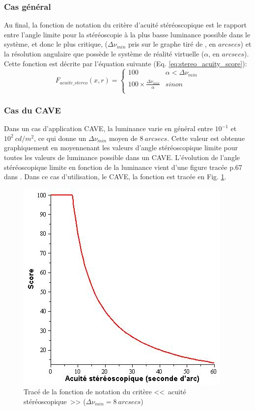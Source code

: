 	\subsubsection{Cas général}	
	\par Au final, la fonction de notation du critère d'acuité stéréoscopique est le rapport entre l'angle limite pour la stéréoscopie à la plus basse luminance possible dans le système, et donc le plus critique, ($\Delta \nu_{min}$ pris sur le graphe tiré de  \citep{gross_human_2008}, en $arcsecs$) et la résolution angulaire que possède le système de réalité virtuelle ($\alpha$, en $arcsecs$). Cette fonction est décrite par l'équation suivante (Eq. \ref{eq:stereo_acuity_score}):
	\begin{equation}
		F_{acuite\_stereo}(x,r) = \begin{cases}
		100 & \alpha < \Delta \nu_{min}\\
		100 \times \frac{\Delta \nu_{min}}{\alpha} & sinon\\
		\end{cases}
		\label{eq:stereo_acuity_score}
	\end{equation}
	
	\subsubsection{Cas du CAVE}	
	\par Dans un cas d'application CAVE, la luminance varie en général entre $10^{-1}$ et $10^{2}~cd/m^2$, ce qui donne un $\Delta \nu_{min}$ moyen de $8~arcsecs$. Cette valeur est obtenue graphiquement en moyennenant les valeurs d'angle stéréoscopique limite pour toutes les valeurs de luminance possible dans un CAVE. L'évolution de l'angle stéréoscopique limite en fonction de la luminance vient d'une figure tracée p.67 dans \citep{gross_human_2008}. Dans ce cas d'utilisation, le CAVE, la fonction est tracée en Fig. \ref{fig:stereo_acuity}.
	
	\begin{figure}[h]
		\centering
		\includegraphics[scale=.75]{Figures/StereoAcuity}
		\caption{Tracé de la fonction de notation du critère <<~acuité stéréoscopique~>> ($\Delta \nu_{min} = 8~arcsecs$)}
		\label{fig:stereo_acuity}
	\end{figure}